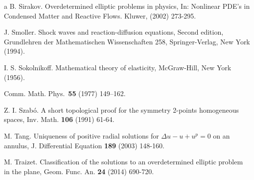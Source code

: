 \documentclass[reqno]{amsart}
\numberwithin{equation}{section}
\newenvironment{key words}{\textbf{Keywords}\mbox{  }}{ }
\begin{document}
\begin{thebibliography}{a}
 B. Sirakov. Overdetermined elliptic problems in physics, In: Nonlinear PDE's in Condensed Matter and Reactive Flows. Kluwer, (2002) 273-295.

 J. Smoller. Shock waves and reaction-diffusion equations, Second edition, Grundlehren der Mathematischen Wissenschaften 258, Springer-Verlag, New York (1994).

 I. S. Sokolnikoff. Mathematical theory of elasticity, McGraw-Hill, New York (1956).

{ Comm. Math. Phys.}~{\bf 55} (1977) 149--162.

 Z. I. Szab\'o. A short topological proof for the symmetry 2-points homogeneous spaces, Inv. Math. {\bf  106} (1991) 61-64.

 M. Tang. Uniqueness of positive radial solutions for
	$\Delta u - u + u^p=0$ on an annulus, J. Differential Equation {\bf 189} (2003) 148-160.

 M. Traizet. Classification of the solutions to an overdetermined elliptic problem in the plane, Geom. Func. An. {\bf  24} (2014) 690-720.

\end{thebibliography}
\end{document}
